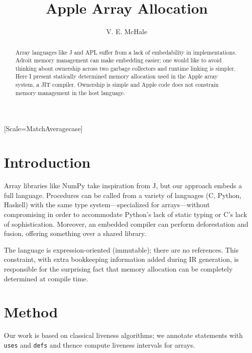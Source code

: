 \documentclass[sigplan,screen]{acmart}
\begin{document}
\setmonofont{Jet Brains Mono}[Scale=MatchAveragecase]

\begin{abstract}
    Array languages like J and APL suffer from a lack of embedability in implementations. Adroit memory management can make embedding easier; one would like to avoid thinking about ownership across two garbage collectors and runtime linking is simpler. Here I present statically determined memory allocation used in the Apple array system, a JIT compiler. Ownership is simple and Apple code does not constrain memory management in the host language.
\end{abstract}

\title{Apple Array Allocation}
\author{V. E. McHale}
\maketitle

\section{Introduction}

Array libraries like NumPy take inspiration from J, but our approach embeds a full language. Procedures can be called from a variety of languages (C, Python, Haskell) with the same type system---specialized for arrays---without compromising in order to accommodate Python's lack of static typing or C's lack of sophistication. Moreover, an embedded compiler can perform deforestation and fusion, offering something over a shared library.


The language is expression-oriented (immutable); there are no references. This constraint, with extra bookkeeping information added during IR generation, is responsible for the surprising fact that memory allocation can be completely determined at compile time.

\section{Method}

Our work is based on classical liveness algorithms; we annotate statements with {\tt uses} and {\tt defs} and thence compute liveness intervals for arrays.

\end{document}
